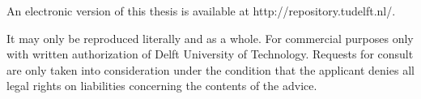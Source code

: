 \begin{titlepage}
\begin{center}
\end{center}

\bigskip
\bigskip
\noindent
An electronic version of this thesis is available at http://repository.tudelft.nl/.

\bigskip

\noindent
It may only be reproduced literally and as a whole. For commercial purposes only with written authorization of Delft University of Technology. Requests for consult are only taken into consideration under the condition that the applicant denies all legal rights on liabilities concerning the contents of the advice.  
\bigskip


\end{titlepage}

